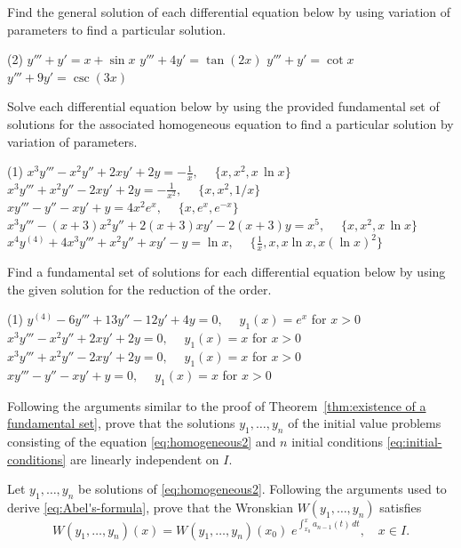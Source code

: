 \begin{Exercise}\label{EX35}
	\vspace{-\baselineskip}%
	
	\Question\label{4-4-1}
Find the general solution of each differential equation below by using variation of parameters to find a particular solution.
	\begin{tasks}(2)
	\task \(y'''+y' = x+\sin x\)
	\task \(y'''+4y' = \tan(2x)\)
	\task \(y'''+y' = \cot x\)
	\task \(y'''+9y' = \csc(3x)\)

	\end{tasks}
	
	\Question\label{4-4-2} Solve each differential equation below by using the provided fundamental set of solutions for the associated homogeneous equation to find a particular solution  by variation of parameters.
	\begin{tasks}(1)
		\task \(x^3 y'''-x^2 y''+2 x y'+2y =-\frac{1}{x},\;\quad \{x, x^2, x \, \ln x\}\)
		\task \(x^3 y'''+x^2 y''-2 x y'+2 y=-\frac{1}{x^2},\;\quad \{x, x^2, 1/x\}\)
		\task \(xy'''-y''-xy'+y = 4x^2 e^x,\; \quad \{x, e^x, e^{-x}\}\)
		\task \(x^3 y'''-(x+3) x^2 y''+2 (x+3) x y'-2 (x+3) y=x^5,\;\quad \{x, x^2, x \, \ln x\}\)
		\task \(x^4 y^{(4)}+4 x^3 y'''+x^2 y''+x y'-y=\ln x,\; \quad \{\frac{1}{x}, x, x \ln x, x (\ln x)^2\}\)
		
	\end{tasks}
	
		\Question\label{4-4-3} Find a fundamental set of solutions for each differential equation below by using the given solution for the reduction of the order.
	\begin{tasks}(1)
		\task \( y^{(4)}-6 y'''+13 y''-12 y'+4y=0,\; \quad  y_1(x) =e^x \) for $x>0$
		\task \(x^3 y'''-x^2 y''+2 x y'+2y =0,\;\quad y_1(x) =x \) for $x>0$
		\task \(x^3 y'''+x^2 y''-2 x y'+2 y=0,\;\quad y_1(x)=x\) for $x>0$
		\task \(xy'''-y''-xy'+y = 0,\; \quad y_1(x)=x\) for $x>0$
	\end{tasks}
	\Question\label{4-4-4} Following the arguments similar to the proof of Theorem~\ref{thm:existence of a fundamental set}, 
	prove that the solutions $y_1, \dots, y_n$ of the initial value problems consisting of the equation \eqref{eq:homogeneous2} and $n$ initial conditions \eqref{eq:initial-conditions} are linearly independent on $I.$
	
	\Question\label{4-4-5} Let $y_1, \dots, y_n$ be solutions of  \eqref{eq:homogeneous2}.  Following the arguments used to  derive \eqref{eq:Abel's-formula}, prove that the Wronskian $W(y_1, \dots, y_n)$ satisfies 
	\[W(y_1, \dots, y_n)(x) = W(y_1, \dots, y_n)(x_0) \; e^{\int_{x_0}^x a_{n-1}(t)\, dt},\quad x\in I.\]

	
\end{Exercise}

